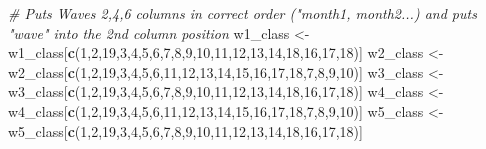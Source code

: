 \documentclass[
]{book}
\newenvironment{Shaded}{\begin{snugshade}}{\end{snugshade}}
\newcommand{\CommentTok}[1]{\textcolor[rgb]{0.56,0.35,0.01}{\textit{#1}}}
\newcommand{\DecValTok}[1]{\textcolor[rgb]{0.00,0.00,0.81}{#1}}
\newcommand{\KeywordTok}[1]{\textcolor[rgb]{0.13,0.29,0.53}{\textbf{#1}}}
\newcommand{\NormalTok}[1]{#1}
\newcommand{\StringTok}[1]{\textcolor[rgb]{0.31,0.60,0.02}{#1}}
\begin{document}
\begin{Shaded}
\begin{Highlighting}[]
\CommentTok{# Puts Waves 2,4,6 columns in correct order ("month1, month2...) and puts "wave" into the 2nd column position}
\NormalTok{w1_class <-}\StringTok{ }\NormalTok{w1_class[}\KeywordTok{c}\NormalTok{(}\DecValTok{1}\NormalTok{,}\DecValTok{2}\NormalTok{,}\DecValTok{19}\NormalTok{,}\DecValTok{3}\NormalTok{,}\DecValTok{4}\NormalTok{,}\DecValTok{5}\NormalTok{,}\DecValTok{6}\NormalTok{,}\DecValTok{7}\NormalTok{,}\DecValTok{8}\NormalTok{,}\DecValTok{9}\NormalTok{,}\DecValTok{10}\NormalTok{,}\DecValTok{11}\NormalTok{,}\DecValTok{12}\NormalTok{,}\DecValTok{13}\NormalTok{,}\DecValTok{14}\NormalTok{,}\DecValTok{18}\NormalTok{,}\DecValTok{16}\NormalTok{,}\DecValTok{17}\NormalTok{,}\DecValTok{18}\NormalTok{)]}
\NormalTok{w2_class <-}\StringTok{ }\NormalTok{w2_class[}\KeywordTok{c}\NormalTok{(}\DecValTok{1}\NormalTok{,}\DecValTok{2}\NormalTok{,}\DecValTok{19}\NormalTok{,}\DecValTok{3}\NormalTok{,}\DecValTok{4}\NormalTok{,}\DecValTok{5}\NormalTok{,}\DecValTok{6}\NormalTok{,}\DecValTok{11}\NormalTok{,}\DecValTok{12}\NormalTok{,}\DecValTok{13}\NormalTok{,}\DecValTok{14}\NormalTok{,}\DecValTok{15}\NormalTok{,}\DecValTok{16}\NormalTok{,}\DecValTok{17}\NormalTok{,}\DecValTok{18}\NormalTok{,}\DecValTok{7}\NormalTok{,}\DecValTok{8}\NormalTok{,}\DecValTok{9}\NormalTok{,}\DecValTok{10}\NormalTok{)]}
\NormalTok{w3_class <-}\StringTok{ }\NormalTok{w3_class[}\KeywordTok{c}\NormalTok{(}\DecValTok{1}\NormalTok{,}\DecValTok{2}\NormalTok{,}\DecValTok{19}\NormalTok{,}\DecValTok{3}\NormalTok{,}\DecValTok{4}\NormalTok{,}\DecValTok{5}\NormalTok{,}\DecValTok{6}\NormalTok{,}\DecValTok{7}\NormalTok{,}\DecValTok{8}\NormalTok{,}\DecValTok{9}\NormalTok{,}\DecValTok{10}\NormalTok{,}\DecValTok{11}\NormalTok{,}\DecValTok{12}\NormalTok{,}\DecValTok{13}\NormalTok{,}\DecValTok{14}\NormalTok{,}\DecValTok{18}\NormalTok{,}\DecValTok{16}\NormalTok{,}\DecValTok{17}\NormalTok{,}\DecValTok{18}\NormalTok{)]}
\NormalTok{w4_class <-}\StringTok{ }\NormalTok{w4_class[}\KeywordTok{c}\NormalTok{(}\DecValTok{1}\NormalTok{,}\DecValTok{2}\NormalTok{,}\DecValTok{19}\NormalTok{,}\DecValTok{3}\NormalTok{,}\DecValTok{4}\NormalTok{,}\DecValTok{5}\NormalTok{,}\DecValTok{6}\NormalTok{,}\DecValTok{11}\NormalTok{,}\DecValTok{12}\NormalTok{,}\DecValTok{13}\NormalTok{,}\DecValTok{14}\NormalTok{,}\DecValTok{15}\NormalTok{,}\DecValTok{16}\NormalTok{,}\DecValTok{17}\NormalTok{,}\DecValTok{18}\NormalTok{,}\DecValTok{7}\NormalTok{,}\DecValTok{8}\NormalTok{,}\DecValTok{9}\NormalTok{,}\DecValTok{10}\NormalTok{)]}
\NormalTok{w5_class <-}\StringTok{ }\NormalTok{w5_class[}\KeywordTok{c}\NormalTok{(}\DecValTok{1}\NormalTok{,}\DecValTok{2}\NormalTok{,}\DecValTok{19}\NormalTok{,}\DecValTok{3}\NormalTok{,}\DecValTok{4}\NormalTok{,}\DecValTok{5}\NormalTok{,}\DecValTok{6}\NormalTok{,}\DecValTok{7}\NormalTok{,}\DecValTok{8}\NormalTok{,}\DecValTok{9}\NormalTok{,}\DecValTok{10}\NormalTok{,}\DecValTok{11}\NormalTok{,}\DecValTok{12}\NormalTok{,}\DecValTok{13}\NormalTok{,}\DecValTok{14}\NormalTok{,}\DecValTok{18}\NormalTok{,}\DecValTok{16}\NormalTok{,}\DecValTok{17}\NormalTok{,}\DecValTok{18}\NormalTok{)]}

\end{Highlighting}
\end{Shaded}
\end{document}

